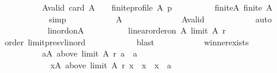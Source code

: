 \begin{isabellebody}
\isanewline
\ \ \ \ \ \ \ \ \ \ A{\isacharunderscore}{\kern0pt}valid{\isacharcolon}{\kern0pt}\ {\isachardoublequoteopen}{\isacharparenleft}{\kern0pt}card\ A\ {\isasymge}\ {}\ {\isasymand}\ finite{\isacharunderscore}{\kern0pt}profile\ A\ p{\isacharparenright}{\kern0pt}{\isachardoublequoteclose}\isanewline
\ \ \ \ \ \ \ \ \isamarkupfalse%
\ finite{\isacharunderscore}{\kern0pt}A{\isacharcolon}{\kern0pt}\ {\isachardoublequoteopen}finite\ A{\isachardoublequoteclose}\isanewline
\ \ \ \ \ \ \ \ \ \ \isamarkupfalse%
\ simp\isanewline
\ \ \ \ \ \ \ \ \isamarkupfalse%
\ \isamarkupfalse%
\ {\isachardoublequoteopen}A\ {\isasymnoteq}\ {\isacharbraceleft}{\kern0pt}{\isacharbraceright}{\kern0pt}{\isachardoublequoteclose}\isanewline
\ \ \ \ \ \ \ \ \ \ \isamarkupfalse%
\ A{\isacharunderscore}{\kern0pt}valid\isanewline
\ \ \ \ \ \ \ \ \ \ \isamarkupfalse%
\ auto\isanewline
\ \ \ \ \ \ \ \ \isamarkupfalse%
\ \isamarkupfalse%
\ lin{\isacharunderscore}{\kern0pt}ord{\isacharunderscore}{\kern0pt}on{\isacharunderscore}{\kern0pt}A{\isacharcolon}{\kern0pt}\isanewline
\ \ \ \ \ \ \ \ \ \ {\isachardoublequoteopen}linear{\isacharunderscore}{\kern0pt}order{\isacharunderscore}{\kern0pt}on\ A\ {\isacharparenleft}{\kern0pt}limit\ A\ r{\isacharparenright}{\kern0pt}{\isachardoublequoteclose}\isanewline
\ \ \ \ \ \ \ \ \ \ \isamarkupfalse%
\ order\ limit{\isacharunderscore}{\kern0pt}presv{\isacharunderscore}{\kern0pt}lin{\isacharunderscore}{\kern0pt}ord\isanewline
\ \ \ \ \ \ \ \ \ \ \isamarkupfalse%
\ blast\isanewline
\ \ \ \ \ \ \ \ \isamarkupfalse%
\ \isamarkupfalse%
\ winner{\isacharunderscore}{\kern0pt}exists{\isacharcolon}{\kern0pt}\isanewline
\ \ \ \ \ \ \ \ \ \ {\isachardoublequoteopen}{\isasymexists}a{\isasymin}A{\isachardot}{\kern0pt}\ above\ {\isacharparenleft}{\kern0pt}limit\ A\ r{\isacharparenright}{\kern0pt}\ a\ {\isacharequal}{\kern0pt}\ {\isacharbraceleft}{\kern0pt}a{\isacharbraceright}{\kern0pt}\ {\isasymand}\isanewline
\ \ \ \ \ \ \ \ \ \ \ \ {\isacharparenleft}{\kern0pt}{\isasymforall}x{\isasymin}A{\isachardot}{\kern0pt}\ above\ {\isacharparenleft}{\kern0pt}limit\ A\ r{\isacharparenright}{\kern0pt}\ x\ {\isacharequal}{\kern0pt}\ {\isacharbraceleft}{\kern0pt}x{\isacharbraceright}{\kern0pt}\ {\isasymlongrightarrow}\ x\ {\isacharequal}{\kern0pt}\ a{\isacharparenright}{\kern0pt}{\isachardoublequoteclose}\isanewline
\ \ \ \ \ \ \ \ \ \ \isamarkupfalse%

\end{isabellebody}
